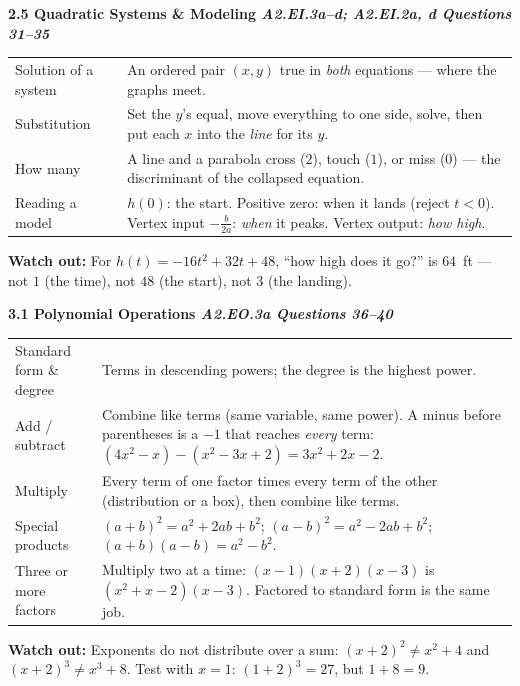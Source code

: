 \documentclass[10pt]{article}
\newcommand{\sghead}[2]{%
  \boxguard[10]%
  \vspace{4pt}\par\noindent
  \colorbox{forest}{\parbox{\dimexpr\linewidth-2\fboxsep}{%
    \small\color{white}\bfseries #1 \hfill \textmd{\itshape\scriptsize\color{forestmid} #2}}}%
  \vspace{2pt}\par}
\newcommand{\sgwatch}[1]{%
  \vspace{1pt}\par\noindent
  \colorbox{redbg}{\parbox{\dimexpr\linewidth-2\fboxsep}{%
    \footnotesize\textbf{\textcolor{redacc}{Watch out:}} #1}}%
  \vspace{1pt}\par}
\newcommand{\sgtabsetup}{\renewcommand{\arraystretch}{1.06}\footnotesize}
\begin{document}
\sghead{2.5 \quad Quadratic Systems \& Modeling}{A2.EI.3a--d; A2.EI.2a, d \;\textbullet\; Questions 31--35}
{\sgtabsetup
\begin{tabularx}{\linewidth}{@{} G X @{}}
Solution of a system & An ordered pair $(x,y)$ true in \emph{both} equations --- where the graphs
  meet. \\
Substitution & Set the $y$'s equal, move everything to one side, solve, then put each $x$ into
  the \emph{line} for its $y$. \\
How many & A line and a parabola cross ($2$), touch ($1$), or miss ($0$) --- the discriminant of
  the collapsed equation. \\
Reading a model & $h(0)$: the start. Positive zero: when it lands (reject $t<0$). Vertex input
  $-\frac{b}{2a}$: \emph{when} it peaks. Vertex output: \emph{how high}. \\
\end{tabularx}}
\sgwatch{For $h(t)=-16t^2+32t+48$, ``how high does it go?'' is $64$~ft --- not $1$ (the time),
not $48$ (the start), not $3$ (the landing).}

\sghead{3.1 \quad Polynomial Operations}{A2.EO.3a \;\textbullet\; Questions 36--40}
{\sgtabsetup
\begin{tabularx}{\linewidth}{@{} G X @{}}
Standard form \& degree & Terms in descending powers; the degree is the highest power. \\
Add / subtract & Combine like terms (same variable, same power). A minus before parentheses is a
  $-1$ that reaches \emph{every} term: $(4x^2-x)-(x^2-3x+2)=3x^2+2x-2$. \\
Multiply & Every term of one factor times every term of the other (distribution or a box), then
  combine like terms. \\
Special products & $(a+b)^2=a^2+2ab+b^2$; $(a-b)^2=a^2-2ab+b^2$; $(a+b)(a-b)=a^2-b^2$. \\
Three or more factors & Multiply two at a time: $(x-1)(x+2)(x-3)$ is $(x^2+x-2)(x-3)$. Factored
  to standard form is the same job. \\
\end{tabularx}}
\sgwatch{Exponents do not distribute over a sum: $(x+2)^2\ne x^2+4$ and $(x+2)^3\ne x^3+8$. Test
with $x=1$: $(1+2)^3=27$, but $1+8=9$.}
\end{document}
